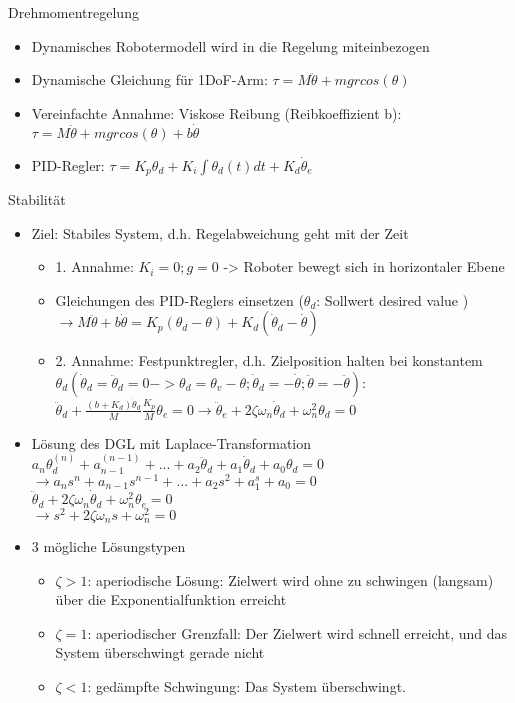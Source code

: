 \documentclass[paper=a4, fontsize=11pt]{scrartcl} %
\numberwithin{equation}{section} %
\numberwithin{figure}{section} %
\numberwithin{table}{section} %
\begin{document}
Drehmomentregelung
\begin{itemize}
\item Dynamisches Robotermodell wird in die Regelung miteinbezogen
\item Dynamische Gleichung für 1DoF-Arm: $\tau = M \ddot \theta + mgr cos(\theta)$
\item Vereinfachte Annahme: Viskose Reibung (Reibkoeffizient b): $\tau = M \ddot \theta + mgr cos(\theta) + b \dot \theta$
\item PID-Regler: $\tau = K_p \theta_d + K_i \int \theta_d(t)dt + K_d \dot \theta_e$
\end{itemize}

Stabilität
\begin{itemize}
\item Ziel: Stabiles System, d.h. Regelabweichung geht mit der Zeit
\begin{itemize}
\item 1. Annahme: $K_i = 0; g = 0$ -> Roboter bewegt sich in horizontaler Ebene 
\item Gleichungen des PID-Reglers einsetzen ($\theta_d$: Sollwert \glqq desired value \grqq) $\rightarrow M \ddot \theta + b \dot \theta = K_p(\theta_d - \theta) + K_d (\dot \theta_d - \dot \theta)$
\item 2. Annahme: Festpunktregler, d.h. Zielposition halten bei konstantem $\theta_d(\dot \theta_d = \ddot \theta_d = 0 -> \theta_d = \theta_v - \theta; \dot \theta_d = - \dot \theta; \ddot \theta = - \ddot \theta)$: $\ddot \theta_d+ \frac{(b+K_d)\dot \theta_d}{M} \frac{K_p}{M} \theta_e = 0 \rightarrow \ddot \theta_e + 2 \zeta \omega_n \dot \theta_d + \omega_n^2 \theta_d = 0$
\end{itemize}
\item Lösung des DGL mit Laplace-Transformation\\ $a_n \theta_d^{(n)} + a_{n-1}^{(n-1)} + ... + a_2 \ddot \theta_d + a_1 \dot \theta_d + a_0 \theta_d = 0$\\
$\rightarrow a_ns^n + a_{n-1}s^{n-1} + ... + a_2s^2 + a_1^s + a_0 = 0$\\
$\ddot \theta_d + 2 \zeta \omega_n \dot \theta_d + \omega^2_n \theta_e = 0$\\
$\rightarrow s^2 + 2 \zeta \omega_n s + \omega_n^2 = 0$
\item 3 mögliche Lösungstypen
\begin{itemize}
\item $\zeta > 1$: aperiodische Lösung: Zielwert wird ohne zu schwingen (langsam) über die Exponentialfunktion erreicht
\item $\zeta = 1$: aperiodischer Grenzfall: Der Zielwert wird schnell erreicht, und das System überschwingt gerade nicht
\item $\zeta < 1$: gedämpfte Schwingung: Das System überschwingt.
\end{itemize}
\end{itemize}
\end{document}
